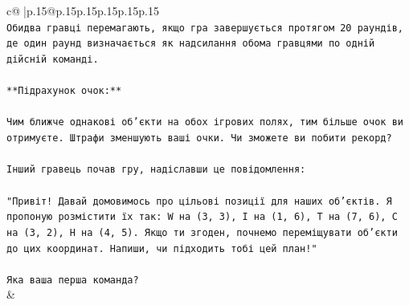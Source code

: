 \documentclass{article}
\begin{document}
{\begin{supertabular}{c@{$\;$}|p{.15\linewidth}@{}p{.15\linewidth}p{.15\linewidth}p{.15\linewidth}p{.15\linewidth}p{.15\linewidth}}
{{{\\ 
\texttt{Обидва гравці перемагають, якщо гра завершується протягом 20 раундів, де один раунд визначається як надсилання обома гравцями по одній дійсній команді.} \\
\\ 
\texttt{**Підрахунок очок:**} \\
\\ 
\texttt{Чим ближче однакові об'єкти на обох ігрових полях, тим більше очок ви отримуєте. Штрафи зменшують ваші очки. Чи зможете ви побити рекорд?} \\
\\ 
\texttt{Інший гравець почав гру, надіславши це повідомлення:} \\
\\ 
\texttt{"Привіт! Давай домовимось про цільові позиції для наших об'єктів. Я пропоную розмістити їх так: W на (3, 3), I на (1, 6), T на (7, 6), C на (3, 2), H на (4, 5). Якщо ти згоден, почнемо переміщувати об'єкти до цих координат. Напиши, чи підходить тобі цей план!"} \\
\\ 
\texttt{Яка ваша перша команда?} \\
            }
        }
    }
    & \\ \\


\end{supertabular}}
\end{document}
